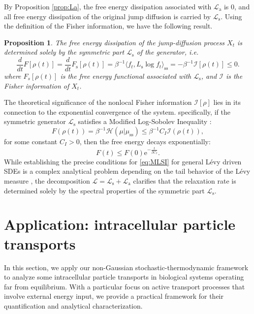 \documentclass[10pt]{article}
\newtheorem{prop}[thm]{Proposition}
\theoremstyle{definition}
\numberwithin{equation}{section}
\begin{document}
By Proposition \ref{prop:La}, the free energy dissipation associated with $\mathcal{L}_\mathrm{a}$ is $0$, and all free energy dissipation of the original jump diffusion is carried by $\mathcal{L}_\mathrm{s}$. 
Using the definition of the Fisher information, we have the following result.


\begin{prop}
The free energy dissipation of the jump-diffusion process $X_t$ is determined solely by the symmetric part $\mathcal{L}_\mathrm{s}$ of the generator, i.e.
\begin{equation*}
    \frac{d}{dt} F[\rho(t)] = \frac{d}{dt} F_\mathrm{s}[\rho(t)]
    = \beta^{-1}\langle f_t, L_\mathrm{s}\log f_t \rangle_\mathrm{ss}
    = -\beta^{-1}\mathcal{I}[\rho(t)]
    \le 0.
\end{equation*}
where $F_{s}[\rho(t)]$ is the free energy functional associated with $\mathcal{L}_\mathrm{s}$, and $\mathcal{I}$ is the Fisher information of $X_t$.
\end{prop}

The theoretical significance of the nonlocal Fisher information $\mathcal{I}[\rho]$ lies in its connection to the exponential convergence of the system. specifically, 
if the symmetric generator $\mathcal{L}_\mathrm{s}$ satisfies a Modified Log-Sobolev Inequality \cite{W00,C04}:
\begin{equation}\label{eq:MLSI}
    F(\rho(t)) = \beta^{-1}\mathcal{H}(\mu | \mu_\mathrm{ss}) \le \beta^{-1}C_{I} \mathcal{I}(\rho(t)),
\end{equation}
for some constant $C_{I} > 0$, 
then the free energy decays exponentially:
$$F(t) \le F(0) \mathrm{e}^{- \frac{t}{\beta C_{I}}}.$$
While establishing the precise conditions for \eqref{eq:MLSI} for general L\'{e}vy driven SDEs is a complex analytical problem depending on the tail behavior of the L\'{e}vy measure \cite{GI08}, 
the decomposition $\mathcal{L} = \mathcal{L}_\mathrm{s} + \mathcal{L}_\mathrm{a}$ clarifies that the relaxation rate is determined solely by the spectral properties of the symmetric part $\mathcal{L}_\mathrm{s}$.


\section{Application: intracellular particle transports}


In this section, we apply our non-Gaussian stochastic-thermodynamic framework to analyze some intracellular particle transports in biological systems operating far from equilibrium.
With a particular focus on active transport processes that involve external energy input, we provide a practical framework for their quantification and analytical characterization.
\end{document}
